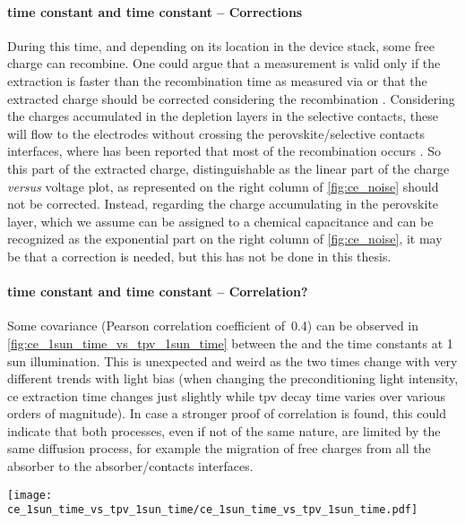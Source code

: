 		\paragraph{ time constant and  time constant -- Corrections}
		During this time, and depending on its location in the device stack, some free charge can recombine.
		One could argue that a  measurement is valid only if the extraction is faster than the recombination time as measured via  \cite{Ryan2017a} or that the extracted charge should be corrected considering the recombination \cite{Credgington2011,Credgington2014}.
		Considering the charges accumulated in the depletion layers in the selective contacts, these will flow to the electrodes without crossing the perovskite/selective contacts interfaces, where has been reported that most of the recombination occurs \cite{Barnea-Nehoshtan2014,Stolterfoht2018a,Stolterfoht2018}.
		So this part of the extracted charge, distinguishable as the linear part of the charge \textsl{versus} voltage plot, as represented on the right column of \cref{fig:ce_noise} should not be corrected.
		Instead, regarding the charge accumulating in the perovskite layer, which we assume can be assigned to a chemical capacitance and can be recognized as the exponential part on the right column of \cref{fig:ce_noise}, it may be that a correction \cite{Shuttle2008a,Shuttle2008b} is needed, but this has not be done in this thesis.

		\paragraph{ time constant and  time constant -- Correlation?}
		Some covariance (Pearson correlation coefficient of~0.4) can be observed in \cref{fig:ce_1sun_time_vs_tpv_1sun_time} between the  and the  time constants at 1 sun illumination.
		This is unexpected and weird as the two times change with very different trends with light bias (when changing the preconditioning light intensity, \gls{ce} extraction time changes just slightly while \gls{tpv} decay time varies over various orders of magnitude).
		In case a stronger proof of correlation is found, this could indicate that both processes, even if not of the same nature, are limited by the same diffusion process, for example the migration of free charges from all the absorber to the absorber/contacts interfaces.

		\begin{SCfigure}%
			\centering
			\texttt{[image: ce\_1sun\_time\_vs\_tpv\_1sun\_time/ce\_1sun\_time\_vs\_tpv\_1sun\_time.pdf]}
			\label{fig:ce_1sun_time_vs_tpv_1sun_time}
		\end{SCfigure}

